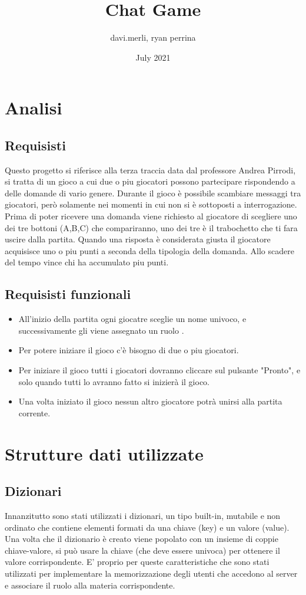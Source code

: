 \documentclass[a4paper,12pt]{report}
\title{Chat Game}
\author{davi.merli, ryan perrina }
\date{July 2021}
\begin{document}
\maketitle
\tableofcontents
\chapter{Analisi}
\section{Requisisti}
Questo progetto si riferisce alla terza traccia data dal professore Andrea Pirrodi, si tratta di un gioco
a cui due o piu giocatori possono partecipare rispondendo a delle domande di vario genere.
Durante il gioco è possibile scambiare messaggi tra giocatori, però solamente nei momenti in cui
non si è sottoposti a interrogazione. Prima di poter ricevere una domanda viene richiesto al giocatore di scegliere uno dei tre bottoni (A,B,C) che compariranno, uno dei tre è il trabochetto che ti fara uscire dalla partita.
 Quando una risposta è considerata giusta il giocatore acquisisce uno o piu punti a seconda della tipologia della domanda. Allo scadere del tempo vince chi ha accumulato piu punti.
\section{Requisisti funzionali}
\begin{itemize}
\item All'inizio della partita ogni giocatre sceglie un nome univoco, e successivamente gli viene assegnato un ruolo .
\item Per potere iniziare il gioco c'è bisogno di due o piu giocatori.
\item Per iniziare il gioco tutti i giocatori dovranno cliccare sul pulsante "Pronto", e solo quando tutti lo avranno fatto si inizierà il gioco.
\item Una volta iniziato il gioco nessun altro giocatore potrà unirsi alla partita corrente.
\end{itemize}
\chapter{Strutture dati utilizzate}
\section{Dizionari}
Innanzitutto sono stati utilizzati i dizionari, un tipo built-in, mutabile e non ordinato che contiene elementi formati da una chiave (key) e un valore
(value). Una volta che il dizionario è creato viene popolato con un insieme di coppie chiave-valore, si può usare la chiave (che deve essere univoca) per
ottenere il valore corrispondente. E' proprio per queste caratteristiche che sono stati utilizzati per implementare la memorizzazione degli utenti che accedono al server e associare il ruolo alla materia corrispondente.
\end{document}
